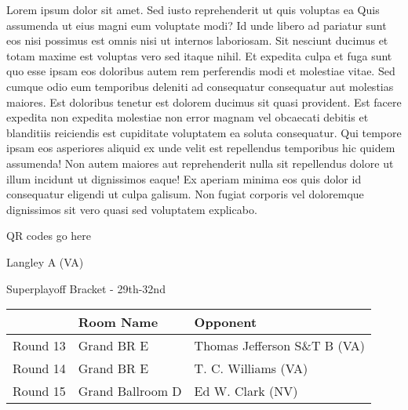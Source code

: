 \documentclass{article}%
\begin{document}
\vspace*{8pt}%
\linebreak%
\newline%
\newline%
Lorem ipsum dolor sit amet. Sed iusto reprehenderit ut quis voluptas ea Quis assumenda ut eius magni eum voluptate modi? Id unde libero ad pariatur sunt eos nisi possimus est omnis nisi ut internos laboriosam. Sit nesciunt ducimus et totam maxime est voluptas vero sed itaque nihil. Et expedita culpa et fuga sunt quo esse ipsam eos doloribus autem rem perferendis modi et molestiae vitae.\newline%
\newline%
Sed cumque odio eum temporibus deleniti ad consequatur consequatur aut molestias maiores. Est doloribus tenetur est dolorem ducimus sit quasi provident. Est facere expedita non expedita molestiae non error magnam vel obcaecati debitis et blanditiis reiciendis est cupiditate voluptatem ea soluta consequatur. Qui tempore ipsam eos asperiores aliquid ex unde velit est repellendus temporibus hic quidem assumenda!\newline%
\newline%
Non autem maiores aut reprehenderit nulla sit repellendus dolore ut illum incidunt ut dignissimos eaque! Ex aperiam minima eos quis dolor id consequatur eligendi ut culpa galisum. Non fugiat corporis vel doloremque dignissimos sit vero quasi sed voluptatem explicabo.\newline%
\newline%
%
\vspace*{30pt}%
\begin{center}%
\begin{Huge}%
QR codes go here%
\end{Huge}%
\end{center}%
\newpage%
\begin{center}%
\begin{Huge}%
Langley A (VA)%
\end{Huge}%
\vspace*{8pt}%
\linebreak%
\begin{Large}%
Superplayoff Bracket {-} 29th{-}32nd%
\end{Large}%
\end{center}%
%
\begin{tabularx}{\textwidth}{|c|Y|Y|}%
\hline%
&Room Name&Opponent\\%
\hline%
Round 13&Grand BR E&Thomas Jefferson S\&T B (VA)\\%
Round 14&Grand BR E&T. C. Williams (VA)\\%
Round 15&Grand Ballroom D&Ed W. Clark (NV)\\%
\hline%
\end{tabularx}%
\end{document}
